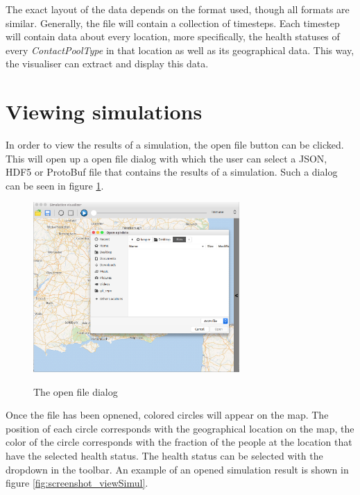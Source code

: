 The exact layout of the data depends on the format used, though all formats are similar. Generally, the file will contain a collection of timesteps. Each timestep will contain data about every location, more specifically, the health statuses of every \emph{ContactPoolType} in that location as well as its geographical data. This way, the visualiser can extract and display this data.


\section{Viewing simulations}
\label{section:viewing}

In order to view the results of a simulation, the open file button can be clicked. This will open up a open file dialog with which the user can select a JSON, HDF5 or ProtoBuf file that contains the results of a simulation. Such a dialog can be seen in figure \ref{fig:screenshot_openFile}.

\begin{figure}[H]
\centering
\includegraphics[width=0.7\textwidth,keepaspectratio]{images/open_file.png}
\label{fig:screenshot_openFile}
\caption{The open file dialog}
\end{figure}

Once the file has been opnened, colored circles will appear on the map. The position of each circle corresponds with the geographical location on the map, the color of the circle corresponds with the fraction of the people at the location that have the selected health status. The health status can be selected with the dropdown in the toolbar. An example of an opened simulation result is shown in figure \ref{fig:screenshot_viewSimul}.

